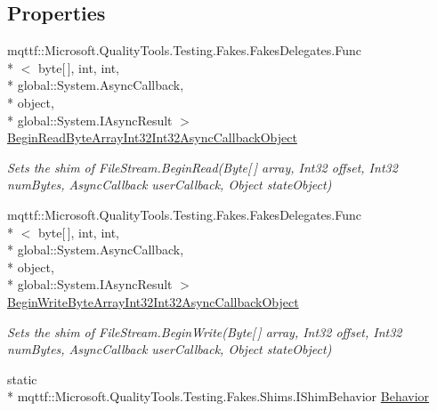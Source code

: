\subsection*{Properties}
\begin{DoxyCompactItemize}
\item 
mqttf\-::\-Microsoft.\-Quality\-Tools.\-Testing.\-Fakes.\-Fakes\-Delegates.\-Func\\*
$<$ byte\mbox{[}$\,$\mbox{]}, int, int, \\*
global\-::\-System.\-Async\-Callback, \\*
object, \\*
global\-::\-System.\-I\-Async\-Result $>$ \hyperlink{class_system_1_1_i_o_1_1_fakes_1_1_shim_file_stream_a17bdd8528af93b73e79e2670bd55647a}{Begin\-Read\-Byte\-Array\-Int32\-Int32\-Async\-Callback\-Object}
\begin{DoxyCompactList}\small\item\em Sets the shim of File\-Stream.\-Begin\-Read(\-Byte\mbox{[}$\,$\mbox{]} array, Int32 offset, Int32 num\-Bytes, Async\-Callback user\-Callback, Object state\-Object)\end{DoxyCompactList}\item 
mqttf\-::\-Microsoft.\-Quality\-Tools.\-Testing.\-Fakes.\-Fakes\-Delegates.\-Func\\*
$<$ byte\mbox{[}$\,$\mbox{]}, int, int, \\*
global\-::\-System.\-Async\-Callback, \\*
object, \\*
global\-::\-System.\-I\-Async\-Result $>$ \hyperlink{class_system_1_1_i_o_1_1_fakes_1_1_shim_file_stream_a6f88a02bb7eb440d5e79a468df280f3f}{Begin\-Write\-Byte\-Array\-Int32\-Int32\-Async\-Callback\-Object}
\begin{DoxyCompactList}\small\item\em Sets the shim of File\-Stream.\-Begin\-Write(\-Byte\mbox{[}$\,$\mbox{]} array, Int32 offset, Int32 num\-Bytes, Async\-Callback user\-Callback, Object state\-Object)\end{DoxyCompactList}\item 
static \\*
mqttf\-::\-Microsoft.\-Quality\-Tools.\-Testing.\-Fakes.\-Shims.\-I\-Shim\-Behavior \hyperlink{class_system_1_1_i_o_1_1_fakes_1_1_shim_file_stream_a3cf081f5ffa8bbef176c5bc2ffffe977}{Behavior}

\end{DoxyCompactItemize}
